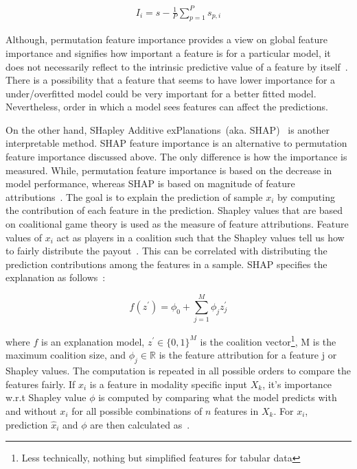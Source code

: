 \vspace{-2mm}
\begin{align}
    I_{i}=s-\frac{1}{P} \sum_{p=1}^{P} s_{p,i}
\end{align}
\fi 

\hspace*{3.5mm} Although, permutation feature importance provides a view on global feature importance and signifies how important a feature is for a particular model, it does not necessarily reflect to the intrinsic predictive value of a feature by itself~\cite{molnar2019interpretable}. There is a possibility that a feature that seems to have lower importance for a under/overfitted model could be very important for a better fitted model. Nevertheless, order in which a model sees features can affect the predictions. 

\hspace*{3.5mm} On the other hand, SHapley Additive exPlanations~(aka. SHAP)~\cite{SHAP} is another interpretable method. SHAP feature importance is an alternative to permutation feature importance discussed above. The only difference is how the importance is measured. While, permutation feature importance is based on the decrease in model performance, whereas SHAP is based on magnitude of feature attributions~\cite{molnar2019interpretable}. The goal is to explain the prediction of sample $x_i$ by computing the contribution of each feature in the prediction. Shapley values that are based on coalitional game theory is used as the measure of feature attributions. Feature values of $x_i$ act as players in a coalition such that the Shapley values tell us how to fairly distribute the payout~\cite{molnar2019interpretable}. This can be correlated with distributing the prediction contributions among the features in a sample. SHAP specifies the explanation as follows~\cite{molnar2019interpretable}:

\begin{equation}
    f\left(z^{\prime}\right)=\phi_{0}+\sum_{j=1}^{M} \phi_{j} z_{j}^{\prime}
\end{equation}

\hspace*{3.5mm} where $f$ is an explanation model, $z^{\prime} \in\{0,1\}^{M}$ is the coalition vector\footnote{Less technically, nothing but simplified features for tabular data}, $\mathrm{M}$ is the maximum coalition size, and $\phi_{j} \in \mathbb{R}$ is the feature attribution for a feature $\mathrm{j}$ or Shapley values. The computation is repeated in all possible orders to compare the features fairly. If $x_i$ is a feature in modality specific input $X_k$, it's importance w.r.t Shapley value $\phi$ is computed by comparing what the model predicts with and without $x_i$ for all possible combinations of $n$ features in $X_k$. For $x_i$, prediction $\hat x_i$ and $\phi$ are then calculated as~\cite{NIPS2017_7062}. 

